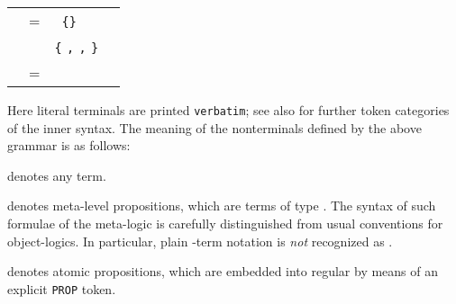 \begin{isabellebody}
\begin{isamarkuptext}
\begin{center}
\begin{supertabular}{rclr}
  \hypertarget{syntax.inner.sort}{\hyperlink{syntax.inner.sort}{\mbox{}}} & = & \hyperlink{syntax.class-name}{\mbox{}}~\verb|{}| \\
    &  & \verb|{| \hyperlink{syntax.class-name}{\mbox{}} \verb|,|  \verb|,| \hyperlink{syntax.class-name}{\mbox{}} \verb|}| \\
  \hypertarget{syntax.inner.class-name}{\hyperlink{syntax.inner.class-name}{\mbox{}}} & = &  \\
  \end{supertabular}
  \end{center}

  \medskip Here literal terminals are printed \verb|verbatim|;
  see also  for further token categories of the
  inner syntax.  The meaning of the nonterminals defined by the above
  grammar is as follows:

  \begin{description}

  \item {}\hyperlink{syntax.inner.any}{\mbox{}} denotes any term.

  \item {}\hyperlink{syntax.inner.prop}{\mbox{}} denotes meta-level propositions,
  which are terms of type .  The syntax of such formulae of
  the meta-logic is carefully distinguished from usual conventions for
  object-logics.  In particular, plain -term notation is
  \emph{not} recognized as \hyperlink{syntax.inner.prop}{\mbox{}}.

  \item {}\hyperlink{syntax.inner.aprop}{\mbox{}} denotes atomic propositions, which
  are embedded into regular \hyperlink{syntax.inner.prop}{\mbox{}} by means of an
  explicit \verb|PROP| token.


\end{description}
\end{isamarkuptext}
\end{isabellebody}
